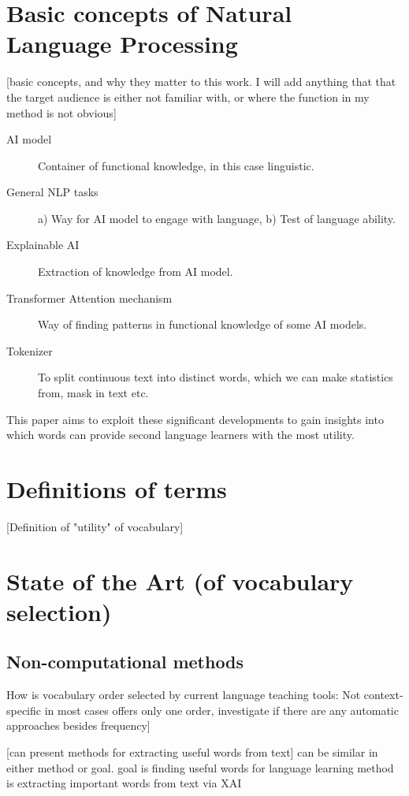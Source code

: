\section{Basic concepts of Natural Language Processing}
 [basic concepts, and why they matter to this work.
  I will add anything that that the target audience is either not familiar with, or where the function in my method is not obvious]

\begin{description}
	\item [AI model] Container of functional knowledge, in this case linguistic.
	\item [General NLP tasks] a) Way for AI model to engage with language, b) Test of language ability.
	\item [Explainable AI] Extraction of knowledge from AI model.
	\item [Transformer Attention mechanism] Way of finding patterns in functional knowledge of some AI models.
	\item [Tokenizer] To split continuous text into distinct words, which we can make statistics from, mask in text etc.
\end{description}

This paper aims to exploit these significant developments to gain insights into which words can provide second language learners with the most utility.

\section{Definitions of terms}
 [Definition of "utility" of vocabulary]

\section{State of the Art (of vocabulary selection)}
\subsection{Non-computational methods}
How is vocabulary order selected by current language teaching tools:
Not context-specific in most cases
offers only one order,
investigate if there are any automatic approaches besides frequency]

[can present methods for extracting useful words from text]
can be similar in either method or goal.
goal is finding useful words for language learning
method is extracting important words from text via XAI

